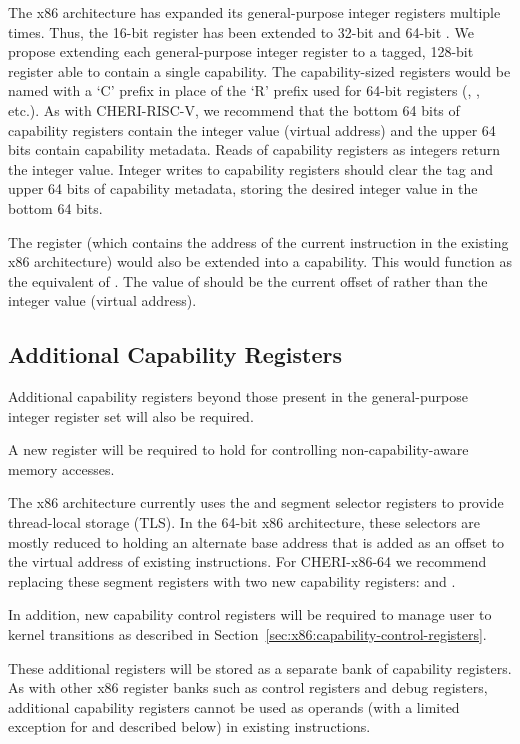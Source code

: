 The x86 architecture has expanded its general-purpose integer registers multiple
times.  Thus, the 16-bit \AX{} register has been extended to 32-bit \EAX{}
and 64-bit \RAX{}.
We propose extending each general-purpose integer register to a tagged, 128-bit register
able to contain a single capability.
The capability-sized registers would be named with a `C' prefix in place
of the `R' prefix used for 64-bit registers
(\CAX{}, \CBX{}, etc.).
As with CHERI-RISC-V,
we recommend that the bottom 64 bits of capability registers contain
the integer value (virtual address) and the upper 64 bits contain
capability metadata.
Reads of capability registers as integers return the integer value.
Integer writes to capability registers
should clear the tag and upper 64 bits of capability metadata, storing the
desired integer value in the bottom 64 bits.

The \RIP{} register (which contains the address of the current
instruction in the existing x86 architecture)
would also be extended into a \CIP{} capability.  This would function as
the equivalent of \PCC{}.
The value of \RIP{} should be the current offset of \CIP{} rather than the
integer value (virtual address).

\subsection{Additional Capability Registers}
\label{sec:x86:additional-caps}

Additional capability registers beyond those present in the general-purpose
integer
register set will also be required.

A new register will be required to hold \DDC{} for controlling
non-capability-aware memory accesses.

The x86 architecture currently uses the \FS{} and \GS{} segment selector registers
to provide thread-local storage (TLS).  In the 64-bit x86 architecture,
these selectors are mostly reduced to holding an alternate base address
that is added as an offset to the virtual address of existing instructions.
For CHERI-x86-64 we recommend replacing these segment registers with two
new capability registers: \CFS{} and \CGS{}.

In addition, new capability control registers will be required to
manage user to kernel transitions as described in
Section~\ref{sec:x86:capability-control-registers}.

These additional registers will be stored as a separate bank of
capability registers.  As with other x86 register banks such as
control registers and debug registers, additional capability registers
cannot be used
as operands (with a limited exception for \CFS{} and \CGS{} described
below) in existing instructions.

